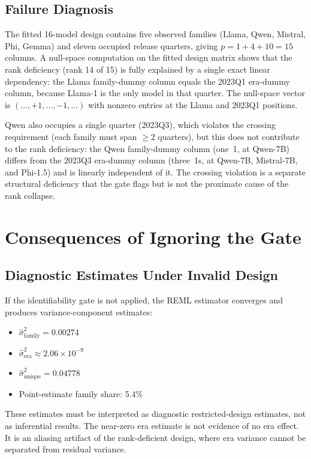 \documentclass{ieeeaccess}
\theoremstyle{definition}
\theoremstyle{plain}
\begin{document}
\subsection{Failure Diagnosis}
The fitted 16-model design contains five observed families (Llama, Qwen, Mistral, Phi, Gemma) and eleven occupied release quarters, giving $p = 1 + 4 + 10 = 15$ columns. A null-space computation on the fitted design matrix shows that the rank deficiency (rank 14 of 15) is fully explained by a single exact linear dependency: the Llama family-dummy column equals the 2023Q1 era-dummy column, because Llama-1 is the only model in that quarter. The null-space vector is $(\ldots, +1, \ldots, -1, \ldots)$ with nonzero entries at the Llama and 2023Q1 positions.

Qwen also occupies a single quarter (2023Q3), which violates the crossing requirement (each family must span $\geq 2$ quarters), but this does not contribute to the rank deficiency: the Qwen family-dummy column (one~1, at Qwen-7B) differs from the 2023Q3 era-dummy column (three~1s, at Qwen-7B, Mistral-7B, and Phi-1.5) and is linearly independent of it. The crossing violation is a separate structural deficiency that the gate flags but is not the proximate cause of the rank collapse.

\section{Consequences of Ignoring the Gate}
\label{sec:consequences}

\subsection{Diagnostic Estimates Under Invalid Design}
If the identifiability gate is not applied, the REML estimator converges and produces variance-component estimates:
\begin{itemize}
\item $\hat{\sigma}^2_{\text{family}} = 0.00274$
\item $\hat{\sigma}^2_{\text{era}} \approx 2.06 \times 10^{-9}$
\item $\hat{\sigma}^2_{\text{unique}} = 0.04778$
\item Point-estimate family share: 5.4\%
\end{itemize}
These estimates must be interpreted as diagnostic restricted-design estimates, not as inferential results. The near-zero era estimate is not evidence of no era effect. It is an aliasing artifact of the rank-deficient design, where era variance cannot be separated from residual variance.
\end{document}
